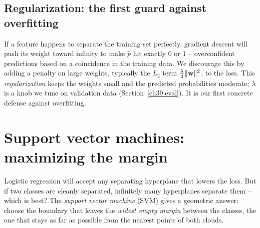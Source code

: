 \subsection{Regularization: the first guard against overfitting}
\label{ch39:reg}

If a feature happens to separate the training set perfectly, gradient descent will push
its weight toward infinity to make $\hat{p}$ hit exactly $0$ or $1$ -- overconfident
predictions based on a coincidence in the training data. We discourage this by adding a penalty on large weights,
typically the $L_2$ term $\tfrac{\lambda}{2}\lVert\mathbf{w}\rVert^2$, to the loss. This
\emph{regularization} keeps the weights small and the predicted probabilities moderate; $\lambda$ is
a knob we tune on validation data (Section~\ref{ch39:eval}). It is our first concrete
defense against overfitting.

\section{Support vector machines: maximizing the margin}
\label{ch39:svm}

Logistic regression will accept any separating hyperplane that lowers the loss. But if
two classes are cleanly separated, infinitely many hyperplanes separate them -- which is
best? The \emph{support vector machine} (SVM) gives a geometric answer: choose the
boundary that leaves the \emph{widest empty margin} between the classes, the one that
stays as far as possible from the nearest points of both clouds.


